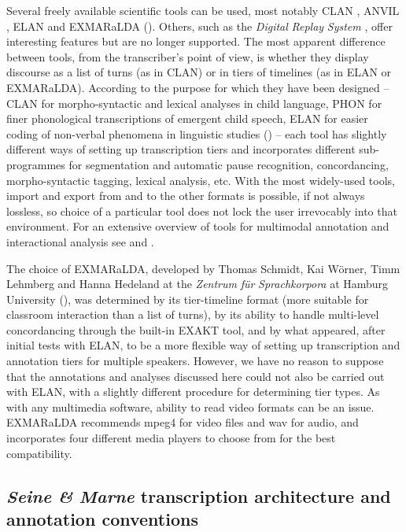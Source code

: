 \documentclass[output=paper,colorlinks,citecolor=brown,modfonts,nonflat]{../langscibook}
\begin{document}
Several freely available scientific tools can be used, most notably CLAN \citep{MacWhinney2000}, ANVIL \citep{Kipp2014}, ELAN \citep{WittenburgEtAl2006} and EXMARaLDA (\citealt{SchmidtWörner2014}). Others, such as the \textit{Digital} \textit{Replay} \textit{System} \citep{BrundellEtAl2008}, offer interesting features but are no longer supported. The most apparent difference between tools, from the transcriber’s point of view, is whether they display discourse as a list of turns (as in CLAN) or in tiers of timelines (as in ELAN or EXMARaLDA). According to the purpose for which they have been designed – CLAN for morpho-syntactic and lexical analyses in child language, PHON for finer phonological transcriptions of emergent child speech, ELAN for easier coding of non-verbal phenomena in linguistic studies (\citealt{LausbergSloetjes2009}) – each tool has slightly different ways of setting up transcription tiers and incorporates different sub-programmes for segmentation and automatic pause recognition, concordancing, morpho-syntactic tagging, lexical analysis, etc. With the most widely-used tools, import and export from and to the other formats is possible, if not always lossless, so choice of a particular tool does not lock the user irrevocably into that environment. For an extensive overview of tools for multimodal annotation and interactional analysis see \citet{CassidySchmidt2017} and \citet{Glüer2018}.

The choice of EXMARaLDA, developed by Thomas Schmidt, Kai Wörner, Timm Lehmberg and Hanna Hedeland at the \textit{Zentrum} \textit{für} \textit{Sprachkorpora} at Hamburg University (\citealt{SchmidtWörner2014}), was determined by its tier-timeline format (more suitable for classroom interaction than a list of turns), by its ability to handle multi-level concordancing through the built-in EXAKT tool, and by what appeared, after initial tests with ELAN, to be a more flexible way of setting up transcription and annotation tiers for multiple speakers. However, we have no reason to suppose that the annotations and analyses discussed here could not also be carried out with ELAN, with a slightly different procedure for determining tier types. As with any multimedia software, ability to read video formats can be an issue. EXMARaLDA recommends mpeg4 for video files and wav for audio, and incorporates four different media players to choose from for the best compatibility.

\subsection{{{\textit{Seine \&}} {\textit{Marne}} transcription architecture and annotation conventions}\label{sec:hilton:3.4}}
\end{document}
